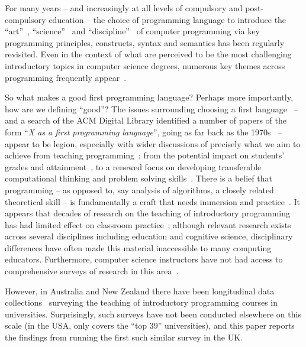 \documentclass[english]{programming}
\begin{document}
For many years -- and increasingly at all levels of compulsory and
post-compulsory education -- the choice of programming language to
introduce the ``art''~\cite{knuth:2011}, ``science''~\cite{gries:1981}
and ``discipline''~\cite{dijkstra:1976} of computer programming via
key programming principles, constructs, syntax and semantics has been
regularly revisited. Even in the context of what are perceived to be
the most challenging introductory topics in computer science degrees,
numerous key themes across programming frequently
appear~\cite{dale:2006}.

So what makes a good first programming language? Perhaps more
importantly, how are we defining ``good''? The issues surrounding
choosing a first language~\cite{gupta:2004,kaplan:2010} -- and a
search of the ACM Digital Library identified a number of papers of the
form ``{\emph{X as a first programming language}}'', going as far back
as the 1970s~\cite{gries:1974} -- appear to be legion, especially with
wider discussions of precisely what we aim to achieve from teaching
programming~\cite{fincher:1999,schult+bennedsen:2006,brown+altadmri:2017};
from the potential impact on students' grades and
attainment~\cite{simon-et-al:2006,bergin+reilly:2006,porter-et-al:2013,mccartney-et-al:2013,ivanovic-et-al:2015},
to a renewed focus on developing transferable computational thinking
and problem solving
skills~\cite{papert:1993,wing:2008,tedre+denning:2016}. There is a
belief that programming -- as opposed to, say analysis of algorithms,
a closely related theoretical skill -- is fundamentally a craft that
needs immersion and practice~\cite{fincher:1999,milne+rowe:2016}. It
appears that decades of research on the teaching of introductory
programming has had limited effect on classroom
practice~\cite{pears-et-al:2007}; although relevant research exists
across several disciplines including education and cognitive science,
disciplinary differences have often made this material inaccessible to
many computing educators. Furthermore, computer science instructors
have not had access to comprehensive surveys of research in this
area~\cite{mccracken-et-al:2001,pears-et-al:2007}.

However, in Australia and New Zealand there have been longitudinal
data
collections~\cite{deraadt-et-al:2004,mason-et-al:2012,mason+cooper:2014}
surveying the teaching of introductory programming courses in
universities. Surprisingly, such surveys have not been conducted
elsewhere on this scale (in the USA, \cite{guo:2014} only covers the
``top 39'' universities), and this paper reports the findings from
running the first such similar survey in the UK.
\end{document}
